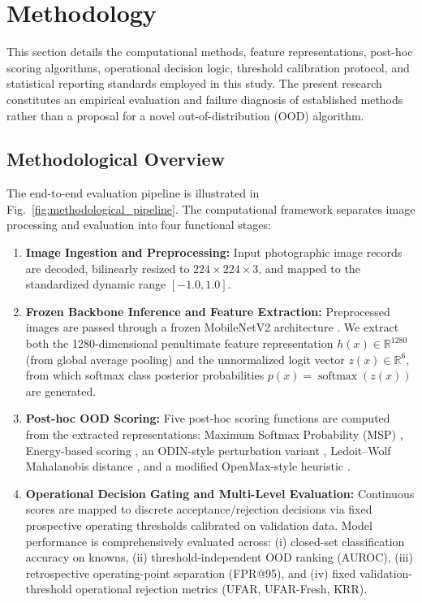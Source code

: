 \section{Methodology}
\label{sec:methodology}

This section details the computational methods, feature representations, post-hoc scoring algorithms, operational decision logic, threshold calibration protocol, and statistical reporting standards employed in this study. The present research constitutes an empirical evaluation and failure diagnosis of established methods rather than a proposal for a novel out-of-distribution (OOD) algorithm.

\subsection{Methodological Overview}
\label{sec:method_overview}

The end-to-end evaluation pipeline is illustrated in Fig.~\ref{fig:methodological_pipeline}. The computational framework separates image processing and evaluation into four functional stages:
\begin{enumerate}
\item \textbf{Image Ingestion and Preprocessing:} Input photographic image records are decoded, bilinearly resized to $224 \times 224 \times 3$, and mapped to the standardized dynamic range $[-1.0, 1.0]$.
\item \textbf{Frozen Backbone Inference and Feature Extraction:} Preprocessed images are passed through a frozen MobileNetV2 architecture \cite{sandler2018mobilenetv2}. We extract both the 1280-dimensional penultimate feature representation $h(x) \in \mathbb{R}^{1280}$ (from global average pooling) and the unnormalized logit vector $z(x) \in \mathbb{R}^6$, from which softmax class posterior probabilities $p(x) = \operatorname{softmax}(z(x))$ are generated.
\item \textbf{Post-hoc OOD Scoring:} Five post-hoc scoring functions are computed from the extracted representations: Maximum Softmax Probability (MSP) \cite{hendrycks2017baseline}, Energy-based scoring \cite{liu2020energy}, an ODIN-style perturbation variant \cite{liang2018enhancing}, Ledoit--Wolf Mahalanobis distance \cite{lee2018simple}, and a modified OpenMax-style heuristic \cite{bendale2016towards}.
\item \textbf{Operational Decision Gating and Multi-Level Evaluation:} Continuous scores are mapped to discrete acceptance/rejection decisions via fixed prospective operating thresholds calibrated on validation data. Model performance is comprehensively evaluated across: (i) closed-set classification accuracy on knowns, (ii) threshold-independent OOD ranking (AUROC), (iii) retrospective operating-point separation (FPR@95), and (iv) fixed validation-threshold operational rejection metrics (UFAR, UFAR-Fresh, KRR).
\end{enumerate}

